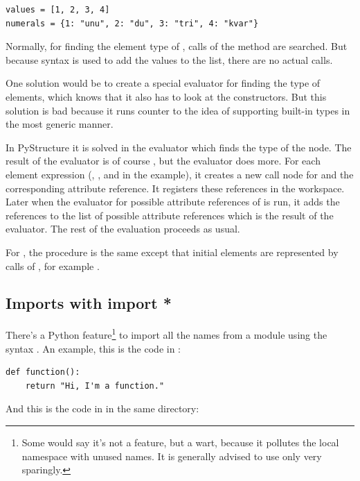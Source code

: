 \documentclass[12pt,halfparskip,DIV11,BCOR10mm]{scrreprt}
\begin{document}
\begin{lstlisting}
values = [1, 2, 3, 4]
numerals = {1: "unu", 2: "du", 3: "tri", 4: "kvar"}
\end{lstlisting}

Normally, for finding the element type of , calls of the method  are searched. But because syntax is used to add the values to the list, there are no actual  calls.

One solution would be to create a special evaluator for finding the type of  elements, which knows that it also has to look at the constructors. But this solution is bad because it runs counter to the idea of supporting built-in types in the most generic manner.

In PyStructure it is solved in the evaluator which finds the type of the  node. The result of the evaluator is of course , but the evaluator does more. For each element expression (, ,  and  in the example), it creates a new call node for  and the corresponding attribute reference. It registers these references in the workspace. Later when the evaluator for possible attribute references of  is run, it adds the references to the list of possible attribute references which is the result of the evaluator. The rest of the evaluation proceeds as usual.

For , the procedure is the same except that initial elements are represented by calls of , for example .

\subsection{Imports with import *}\label{import_star}

There's a Python feature\footnote{Some would say it's not a feature, but a wart, because it pollutes the local namespace with unused names. It is generally advised to use  only very sparingly.} to import all the names from a module using the syntax . An example, this is the code in :

\begin{lstlisting}
def function():
    return "Hi, I'm a function."
\end{lstlisting}

And this is the code in  in the same directory:
\end{document}
